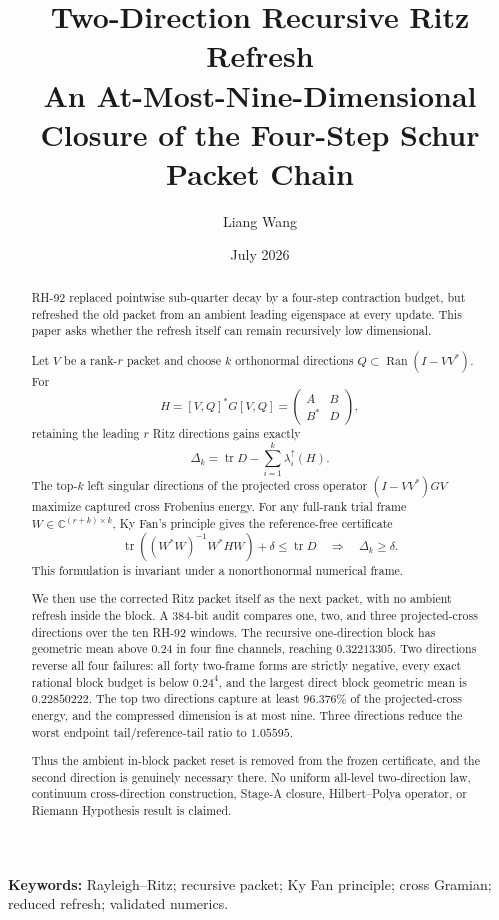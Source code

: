 \documentclass[11pt]{article}
\title{Two-Direction Recursive Ritz Refresh\\
\large An At-Most-Nine-Dimensional Closure of the Four-Step Schur Packet Chain}
\author{Liang Wang}
\date{July 2026}
\theoremstyle{definition}
\theoremstyle{remark}
\newcommand{\tr}{\operatorname{tr}}
\newcommand{\Ran}{\operatorname{Ran}}
\begin{document}
\maketitle

\begin{abstract}
RH-92 replaced pointwise sub-quarter decay by a four-step contraction budget,
but refreshed the old packet from an ambient leading eigenspace at every
update.  This paper asks whether the refresh itself can remain recursively
low dimensional.

Let $V$ be a rank-$r$ packet and choose $k$ orthonormal directions
$Q\subset\Ran(I-VV^*)$.  For
\[
 H=[V,Q]^*G[V,Q]=
 \begin{pmatrix}A&B\\B^*&D\end{pmatrix},
\]
retaining the leading $r$ Ritz directions gains exactly
\[
 \Delta_k=\tr D-\sum_{i=1}^k\lambda_i^{\uparrow}(H).
\]
The top-$k$ left singular directions of the projected cross operator
$(I-VV^*)GV$ maximize captured cross Frobenius energy.  For any full-rank
trial frame $W\in\mathbb C^{(r+k)\times k}$, Ky Fan's principle gives the
reference-free certificate
\[
 \tr\!\left((W^*W)^{-1}W^*HW\right)+\delta\le\tr D
 \quad\Longrightarrow\quad \Delta_k\ge\delta.
\]
This formulation is invariant under a nonorthonormal numerical frame.

We then use the corrected Ritz packet itself as the next packet, with no
ambient refresh inside the block.  A 384-bit audit compares one, two, and
three projected-cross directions over the ten RH-92 windows.  The recursive
one-direction block has geometric mean above $0.24$ in four fine channels,
reaching $0.32213305$.  Two directions reverse all four failures: all forty
two-frame forms are strictly negative, every exact rational block budget is
below $0.24^4$, and the largest direct block geometric mean is
$0.22850222$.  The top two directions capture at least $96.376\%$ of the
projected-cross energy, and the compressed dimension is at most nine.  Three
directions reduce the worst endpoint tail/reference-tail ratio to $1.05595$.

Thus the ambient in-block packet reset is removed from the frozen
certificate, and the second direction is genuinely necessary there.  No
uniform all-level two-direction law, continuum cross-direction construction,
Stage-A closure, Hilbert--Polya operator, or Riemann Hypothesis result is
claimed.
\end{abstract}

\noindent\textbf{Keywords:} Rayleigh--Ritz; recursive packet; Ky Fan
principle; cross Gramian; reduced refresh; validated numerics.
\end{document}
